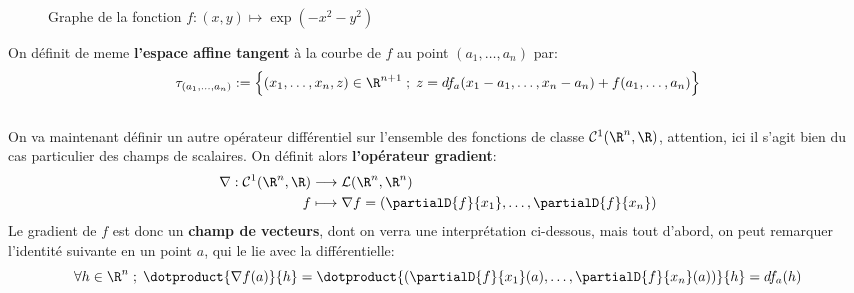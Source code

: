 \begin{figure}[h]
   \centering
   \captionsetup{labelformat=empty}
   \caption{Graphe de la fonction \(f : (x, y) \mapsto \exp(-x^2 - y^2)\)}
\end{figure}
On définit de meme \textbf{l'espace affine tangent} à la courbe de \(f\) au point \((a_1, \ldots, a_n)\) par:
\[
   \tau_{(a_1, \ldots, a_n)} := \Bigl\{ (x_1, \ldots, x_n, z) \in \R^{n+1} \; ; \; z = df_a(x_1 - a_1, \ldots, x_n - a_n) + f(a_1, \ldots, a_n) \Bigl\}    
\]

\subsection*{}
On va maintenant définir un autre opérateur différentiel sur l'ensemble des fonctions de classe \(\mathcal{C}^1(\R^n, \R)\), attention, ici il s'agit bien du cas particulier des champs de scalaires. On définit alors \textbf{l'opérateur gradient}:
\[
   \begin{aligned}
      \nabla : \mathcal{C}^1(\R^n, \R) &\longrightarrow \mathcal{L}(\R^n, \R^n)\\
      f &\longmapsto \nabla f = \left(\partialD{f}{x_1}, \ldots, \partialD{f}{x_n}\right)
   \end{aligned}
\]
Le gradient de \(f\) est donc un \textbf{champ de vecteurs}, dont on verra une interprétation ci-dessous, mais tout d'abord, on peut remarquer l'identité suivante en un point \(a\), qui le lie avec la différentielle:
\[
   \forall h \in \R^n \; ; \; \dotproduct{\nabla f(a)}{h} = \dotproduct{\left(\partialD{f}{x_1}(a), \ldots, \partialD{f}{x_n}(a)\right)}{h} = df_a(h)
\]

